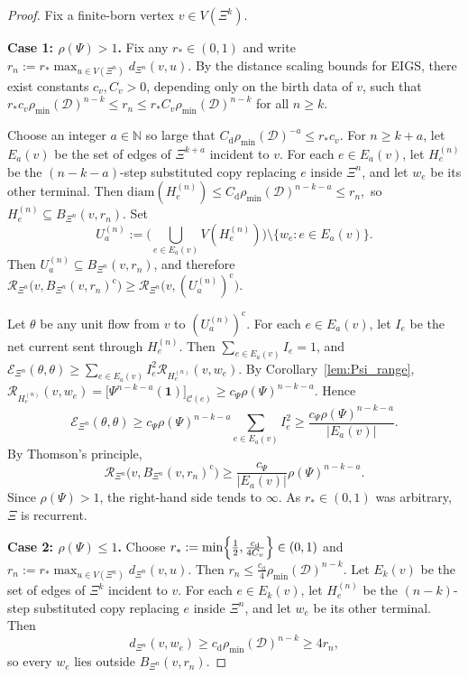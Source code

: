 \documentclass{article}
\theoremstyle{plain}
\theoremstyle{definition}
\newcommand{\dist}{\mathrm{d}}
\newcommand{\diam}{\mathrm{diam}}
\newcommand{\Reff}{\mathscr{R}}
\begin{document}
\begin{proof}
Fix a finite-born vertex $v\in V(\Xi^k)$.

\textbf{Case 1: $\rho(\Psi)>1$.}
Fix any $r_*\in(0,1)$ and write
$
r_n:=r_*\max_{u\in V(\Xi^n)} d_{\Xi^n}(v,u).
$
By the distance scaling bounds for EIGS, there exist constants $c_v,C_v>0$, depending only on the birth data of $v$, such that
$
r_*c_v\rho_{\min}(\mathcal D)^{n-k}
\le
r_n
\le
r_*C_v\rho_{\min}(\mathcal D)^{n-k}
$
for all $n\ge k$.

Choose an integer $a\in\mathbb N$ so large that
$
C_{\dist}\rho_{\min}(\mathcal D)^{-a}\le r_*c_v.
$
For $n\ge k+a$, let $E_a(v)$ be the set of edges of $\Xi^{k+a}$ incident to $v$.
For each $e\in E_a(v)$, let $H_e^{(n)}$ be the $(n-k-a)$-step substituted copy replacing $e$ inside $\Xi^n$, and let $w_e$ be its other terminal.
Then
$
\diam(H_e^{(n)})
\le
C_{\dist}\rho_{\min}(\mathcal D)^{n-k-a}
\le
r_n,
$
so $H_e^{(n)}\subseteq B_{\Xi^n}(v,r_n)$.
Set
\[
U_a^{(n)}
:=
\Big(\bigcup_{e\in E_a(v)} V(H_e^{(n)})\Big)\setminus \{w_e:e\in E_a(v)\}.
\]
Then $U_a^{(n)}\subseteq B_{\Xi^n}(v,r_n)$, and therefore
$
\Reff_{\Xi^n}\bigl(v,B_{\Xi^n}(v,r_n)^{\mathrm c}\bigr)
\ge
\Reff_{\Xi^n}\bigl(v,(U_a^{(n)})^{\mathrm c}\bigr).
$

Let $\theta$ be any unit flow from $v$ to $(U_a^{(n)})^{\mathrm c}$.
For each $e\in E_a(v)$, let $I_e$ be the net current sent through $H_e^{(n)}$.
Then $\sum_{e\in E_a(v)} I_e=1$, and
$
\mathcal E_{\Xi^n}(\theta,\theta)
\ge
\sum_{e\in E_a(v)} I_e^2 \Reff_{H_e^{(n)}}(v,w_e).
$
By Corollary~\ref{lem:Psi_range},
$
\Reff_{H_e^{(n)}}(v,w_e)
=
\big[\Psi^{n-k-a}(\mathbf 1)\big]_{\mathscr C(e)}
\ge
c_{\Psi}\rho(\Psi)^{n-k-a}.
$
Hence
\[
\mathcal E_{\Xi^n}(\theta,\theta)
\ge
c_{\Psi}\rho(\Psi)^{n-k-a}\sum_{e\in E_a(v)} I_e^2
\ge
\frac{c_{\Psi}\rho(\Psi)^{n-k-a}}{|E_a(v)|}.
\]
By Thomson's principle,
\[
\Reff_{\Xi^n}\bigl(v,B_{\Xi^n}(v,r_n)^{\mathrm c}\bigr)
\ge
\frac{c_{\Psi}}{|E_a(v)|}\rho(\Psi)^{n-k-a}.
\]
Since $\rho(\Psi)>1$, the right-hand side tends to $\infty$.
As $r_*\in(0,1)$ was arbitrary, $\Xi$ is recurrent.

\textbf{Case 2: $\rho(\Psi)\le 1$.}
Choose
$
r_*:=\min\Bigl\{\frac12,\frac{c_{\dist}}{4C_v}\Bigr\}\in(0,1)
$
and
$
r_n:=r_*\max_{u\in V(\Xi^n)} d_{\Xi^n}(v,u).
$
Then
$
r_n\le \frac{c_{\dist}}{4}\rho_{\min}(\mathcal D)^{n-k}.
$
Let $E_k(v)$ be the set of edges of $\Xi^k$ incident to $v$.
For each $e\in E_k(v)$, let $H_e^{(n)}$ be the $(n-k)$-step substituted copy replacing $e$ inside $\Xi^n$, and let $w_e$ be its other terminal.
Then
\[
d_{\Xi^n}(v,w_e)\ge c_{\dist}\rho_{\min}(\mathcal D)^{n-k}\ge 4r_n,
\]
so every $w_e$ lies outside $B_{\Xi^n}(v,r_n)$.


\end{proof}
\end{document}
